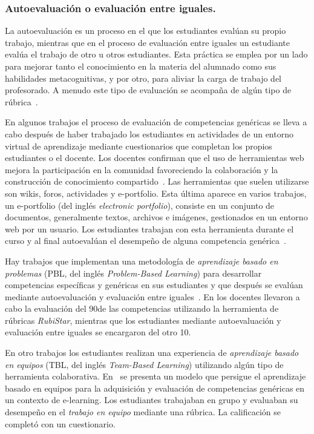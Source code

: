 \subsubsection*{Autoevaluación o evaluación entre iguales.}

La autoevaluación es un proceso en el que los estudiantes evalúan su propio trabajo, mientras que  en el proceso de evaluación entre iguales un estudiante evalúa el trabajo de otro u otros estudiantes. Esta práctica se emplea por un lado para mejorar tanto el conocimiento en la materia del alumnado como sus habilidades metacognitivas, y por otro, para aliviar la carga de trabajo del profesorado. A menudo este tipo de evaluación se acompaña de algún tipo de rúbrica~\cite{malehorn1994ten}.

En algunos trabajos el proceso de evaluación de competencias genéricas se lleva a cabo después de haber trabajado los estudiantes en actividades de un entorno virtual de aprendizaje mediante cuestionarios que completan los propios estudiantes o el docente. Los docentes confirman que el uso de herramientas web mejora la participación en la comunidad favoreciendo la colaboración y la construcción de conocimiento compartido~\cite{starcic2008sustaining}. Las herramientas que suelen utilizarse son wikis, foros, actividades y e-portfolio. Esta última aparece en varios trabajos, un e-portfolio (del inglés \emph{electronic portfolio}), consiste en un conjunto de documentos, generalmente textos, archivos e imágenes, gestionados en un entorno web por un usuario. Los estudiantes trabajan con esta herramienta durante el curso y al final autoevalúan el desempeño de alguna competencia genérica~\cite{arno2011promoting}. 

Hay trabajos que implementan una metodología de \emph{aprendizaje basado en problemas} (PBL, del inglés \emph{Problem-Based Learning}) para desarrollar competencias específicas y genéricas en sus estudiantes y que después se evalúan mediante autoevaluación y evaluación entre iguales~\cite{martinez2014teamwork}. En \cite{lasa2013problem} los docentes llevaron a cabo la evaluación del 90\percentage{ }de las competencias utilizando la herramienta de rúbricas \emph{RubiStar}, mientras que los estudiantes mediante autoevaluación y evaluación entre iguales se encargaron del otro 10\percentage. 

En otro trabajos los estudiantes realizan una experiencia de \emph{aprendizaje basado en equipos} (TBL, del inglés \emph{Team-Based Learning}) utilizando algún tipo de herramienta colaborativa. En~\cite{ficapal2015learning} se presenta un modelo que persigue el aprendizaje basado en equipos para la adquisición y evaluación de competencias genéricas en un contexto de e-learning. Los estudiantes trabajaban en grupo y evaluaban su desempeño en el \emph{trabajo en equipo} mediante una rúbrica. La calificación se completó con un cuestionario. 

